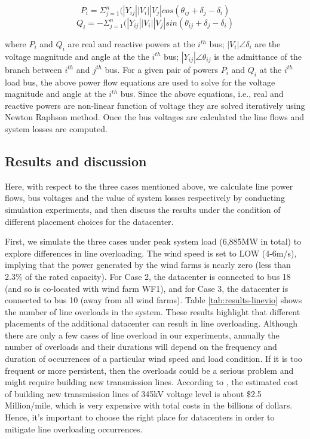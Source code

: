 \begin{equation}
P_{i} = \Sigma_{j=1}^{n}(|Y_{ij}||V_{i}||V_{j}|cos(\theta_{ij}+\delta_{j}-\delta_{i})
\end{equation}
\begin{equation}
Q_{i} = -\Sigma_{j=1}^{n}(|Y_{ij}||V_{i}||V_{j}|sin(\theta_{ij}+\delta_{j}-\delta_{i})
\end{equation}

\noindent where $P_{i}$ and $Q_{i}$ are real and reactive powers at
the $i^{th}$ bus; $|V_{i}|\angle \delta_{i}$ are the voltage magnitude
and angle at the the $i^{th}$ bus; $|Y_{ij}|\angle \theta_{ij}$ is
the admittance of the branch between $i^{th}$ and $j^{th}$ bus.  For a
given pair of powers $P_{i}$ and $Q_{i}$ at the $i^{th}$ load bus, the above
power flow equations are used to solve for the voltage magnitude and
angle at the $i^{th}$ bus. Since the above equations, i.e., real and
reactive powers are non-linear function of voltage they are solved
iteratively using Newton Raphson method. Once the bus voltages are
calculated the line flows and system losses are
computed.

\subsection{Results and discussion}

Here, with respect to the three cases mentioned above, we calculate
line power flows, bus voltages and the value of system losses
respectively by conducting simulation experiments, and then discuss
the results under the condition of different placement choices for the
datacenter.

First, we simulate the three cases under peak system load (6,885MW in
total) to explore differences in line overloading.  The wind speed is
set to LOW (4-6m/s), implying that the power generated by the wind
farms is nearly zero (less than 2.3\% of the rated capacity).  For
Case 2, the datacenter is connected to bus 18 (and so is co-located
with wind farm WF1), and for Case 3, the datacenter is connected to
bus 10 (away from all wind farms).  Table \ref{tab:results-linevio}
shows the number of line overloads in the system.  These results
highlight that different placements of the additional datacenter can
result in line overloading.  Although there are only a few cases of
line overload in our experiments, annually the number of overloads and
their durations will depend on the frequency and duration of
occurrences of a particular wind speed and load condition. If it is
too frequent or more persistent, then the overloads could be a serious
problem and might require building new transmission lines. According
to \cite{interconnection2010survey}, the estimated cost of building
new transmission lines of 345kV voltage level is about \$2.5
Million/mile, which is very expensive with total costs in the billions
of dollars. Hence, it's important to choose the right place for
datacenters in order to mitigate line overloading occurrences.

